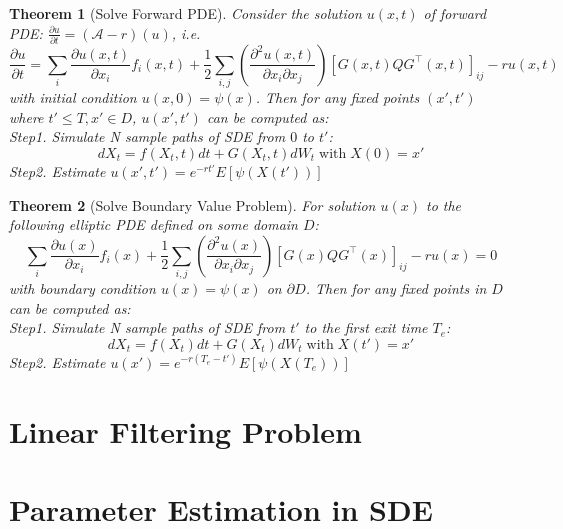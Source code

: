 \documentclass{article}
\newtheorem{theorem}{Theorem}
\begin{document}
\begin{theorem}[Solve Forward PDE]
    Consider the solution $u(x, t)$ of forward PDE: $\frac{\partial u}{\partial t}=(\mathcal{A}-r)(u)$, i.e.
    \begin{equation}
        \frac{\partial u}{\partial t}=\sum_{i} \frac{\partial u(x, t)}{\partial x_{i}} f_{i}(x, t)+\frac{1}{2} \sum_{i, j}\left(\frac{\partial^{2}u(x, t)}{\partial x_{i} \partial x_{j}}\right)\left[G(x, t) Q G^{\top}(x, t)\right]_{i j} - ru(x, t)
    \end{equation}
    with initial condition $u(x, 0)=\psi(x)$. Then for any fixed points $(x', t')$ where $t'\leq T, x'\in D$, $u(x', t')$ can be computed as:\\
    Step1. Simulate N sample paths of SDE from $0$ to $t'$:
    \begin{equation}
        dX_t=f(X_t, t)dt + G(X_t, t)dW_t\operatorname{with}X(0)=x'
    \end{equation}
    Step2. Estimate $u(x', t') = e^{-rt'}E\left[\psi(X(t'))\right]$
\end{theorem}
\begin{theorem}[Solve Boundary Value Problem]
    For solution $u(x)$ to the following elliptic PDE defined on some domain $D$:
    \begin{equation}
        \sum_{i} \frac{\partial u(x)}{\partial x_{i}} f_{i}(x)+\frac{1}{2} \sum_{i, j}\left(\frac{\partial^{2}u(x)}{\partial x_{i} \partial x_{j}}\right)\left[G(x) Q G^{\top}(x)\right]_{i j} - ru(x)=0
    \end{equation}
    with boundary condition $u(x)=\psi(x)$ on $\partial D$. Then for any fixed points in $D$ can be computed as:\\
    Step1. Simulate N sample paths of SDE from $t'$ to the first exit time $T_e$:
    \begin{equation}
        dX_t=f(X_t)dt + G(X_t)dW_t\operatorname{with}X(t')=x'
    \end{equation}
    Step2. Estimate $u(x') = e^{-r(T_e-t')}E\left[\psi(X(T_e))\right]$
\end{theorem}

\section{Linear Filtering Problem}
\section{Parameter Estimation in SDE}
\end{document}
